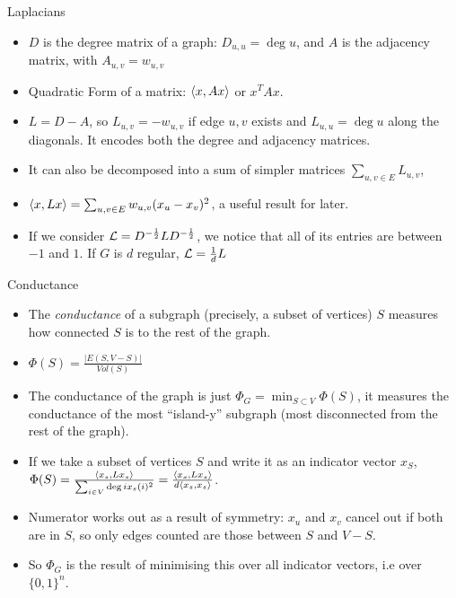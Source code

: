 \documentclass[presentation]{beamer}
\begin{document}
\begin{frame}[label={sec:org6d51ab1}]{Laplacians}
\begin{itemize}
\item \(D\) is the degree matrix of a graph: \(D_{u,u}= \deg u\), and \(A\) is the adjacency matrix, with \(A_{u,v}=w_{u,v}\)
\item Quadratic Form of a matrix: \(\langle x , Ax \rangle\) or \(x^TAx\).
\item \(L=D-A\), so \(L_{u,v}=-w_{u,v}\) if edge \(u,v\) exists and \(L_{u,u}=\deg u\)  along the diagonals. It encodes both the degree and adjacency matrices.
\item It can also be decomposed into a sum of simpler matrices  \(\sum_{u,v \in E}L_{u,v}\),
\item \(\langle x , Lx \rangle=\sum_{u,v \in E} w_{u,v}(x_u-x_v)^2\), a useful result for later.
\item If we consider \(\mathcal{L} = D^{-\frac12}LD^{-\frac12}\), we notice that all of its entries are between \(-1\) and \(1\). If \(G\) is \(d\) regular, \(\mathcal{L}=\frac{1}{d}L\)
\end{itemize}
\end{frame}
\begin{frame}[label={sec:org7f51f79}]{Conductance}
\begin{itemize}
\item The \emph{conductance} of a subgraph (precisely, a subset of vertices) \(S\) measures how connected \(S\) is to the rest of the graph.
\item \(\Phi(S)=\frac{|E(S,V-S)|}{Vol(S)}\)
\item The conductance of the graph  is just \(\Phi_G=\min_{S \subset V} \Phi(S)\), it measures the conductance of the most ``island-y'' subgraph (most disconnected from the rest of the graph).
\item If we take a subset of vertices \(S\) and write it as an indicator vector \(x_S\), \(\Phi(S)=\frac{\langle x_s , Lx_s \rangle}{\sum_{i \in V}\deg i x_s(i)^2}= \frac{\langle x_s , Lx_s \rangle}{d \langle x_s , x_s \rangle}\).
\end{itemize}

\begin{itemize}
\item Numerator works out as a result of symmetry: \(x_u\) and \(x_v\) cancel out if both are in \(S\), so only edges counted are those between \(S\) and \(V-S\).
\item So \(\Phi_G\) is the result of minimising this over all indicator vectors, i.e over \(\{0,1\}^n\).
\end{itemize}
\end{frame}
\end{document}
